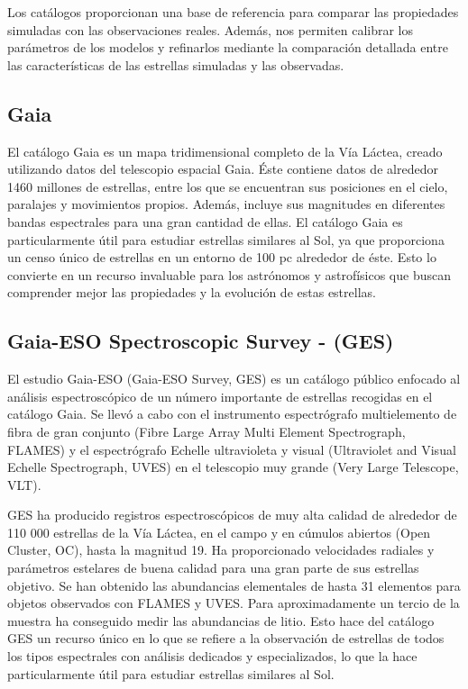 Los catálogos proporcionan una base de referencia para comparar las propiedades simuladas con las observaciones reales. Además, nos permiten calibrar los parámetros de los modelos y refinarlos mediante la comparación detallada entre las características de las estrellas simuladas y las observadas.\par


\subsection{Gaia}
El catálogo Gaia \citep{Mignard2005} es un mapa tridimensional completo de la Vía Láctea, creado utilizando datos del telescopio espacial Gaia. Éste contiene datos de alrededor 1460 millones de estrellas, entre los que se encuentran sus posiciones en el cielo, paralajes y movimientos propios. Además, incluye sus magnitudes en diferentes bandas espectrales para una gran cantidad de ellas. El catálogo Gaia es particularmente útil para estudiar estrellas similares al Sol, ya que proporciona un censo único de estrellas en un entorno de 100 pc alrededor de éste. Esto lo convierte en un recurso invaluable para los astrónomos y astrofísicos que buscan comprender mejor las propiedades y la evolución de estas estrellas.\par

\subsection{Gaia-ESO Spectroscopic Survey - (GES)}
El estudio Gaia-ESO (Gaia-ESO Survey, GES) \citep{Gilmore2012,Randich2013,Randich2022} es un catálogo público enfocado al análisis espectroscópico de un número importante de estrellas recogidas en el catálogo Gaia. Se llevó a cabo con el instrumento espectrógrafo multielemento de fibra de gran conjunto (Fibre Large Array Multi Element Spectrograph, FLAMES) y el espectrógrafo Echelle ultravioleta y visual (Ultraviolet and Visual Echelle Spectrograph, UVES) en el telescopio muy grande (Very Large Telescope, VLT).\par

GES ha producido registros espectroscópicos de muy alta calidad de alrededor de 110 000 estrellas de la Vía Láctea, en el campo y en cúmulos abiertos (Open Cluster, OC), hasta la magnitud 19. Ha proporcionado velocidades radiales y parámetros estelares de buena calidad para una gran parte de sus estrellas objetivo. Se han obtenido las abundancias elementales de hasta 31 elementos para objetos observados con FLAMES y UVES. Para aproximadamente un tercio de la muestra ha conseguido medir las abundancias de litio. Esto hace del catálogo GES un recurso único en lo que se refiere a la observación de estrellas de todos los tipos espectrales con análisis dedicados y especializados, lo que la hace particularmente útil para estudiar estrellas similares al Sol.\par

